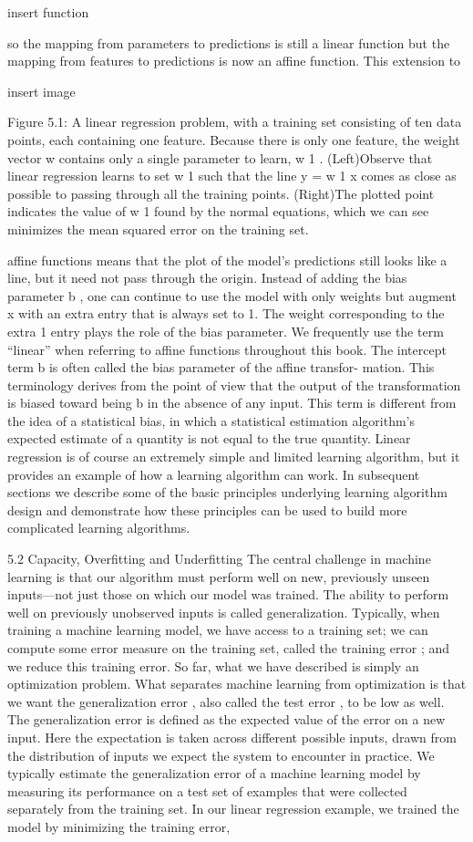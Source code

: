 \documentclass[11pt]{article}
\begin{document}
    insert function

so the mapping from parameters to predictions is still a linear function but the
mapping from features to predictions is now an aﬃne function. This extension to

    insert image

Figure 5.1: A linear regression problem, with a training set consisting of ten data points,
each containing one feature. Because there is only one feature, the weight vector
w
contains only a single parameter to learn,
w
1
. (Left)Observe that linear regression learns
to set
w
1
such that the line
y
=
w
1
x
comes as close as possible to passing through all the
training points. (Right)The plotted point indicates the value of
w
1
found by the normal
equations, which we can see minimizes the mean squared error on the training set.

aﬃne functions means that the plot of the model’s predictions still looks like a
line, but it need not pass through the origin. Instead of adding the bias parameter
b
, one can continue to use the model with only weights but augment
x
with an
extra entry that is always set to 1. The weight corresponding to the extra 1 entry
plays the role of the bias parameter. We frequently use the term “linear” when
referring to aﬃne functions throughout this book.
The intercept term
b
is often called the
bias
parameter of the aﬃne transfor-
mation. This terminology derives from the point of view that the output of the
transformation is biased toward being
b
in the absence of any input. This term
is diﬀerent from the idea of a statistical bias, in which a statistical estimation
algorithm’s expected estimate of a quantity is not equal to the true quantity.
Linear regression is of course an extremely simple and limited learning algorithm,
but it provides an example of how a learning algorithm can work. In subsequent
sections we describe some of the basic principles underlying learning algorithm
design and demonstrate how these principles can be used to build more complicated
learning algorithms.

5.2 Capacity, Overﬁtting and Underﬁtting
The central challenge in machine learning is that our algorithm must perform
well on new, previously unseen inputs—not just those on which our model was
trained. The ability to perform well on previously unobserved inputs is called
generalization.
Typically, when training a machine learning model, we have access to a training
set; we can compute some error measure on the training set, called the
training
error
; and we reduce this training error. So far, what we have described is simply
an optimization problem. What separates machine learning from optimization is
that we want the
generalization error
, also called the
test error
, to be low as
well. The generalization error is deﬁned as the expected value of the error on a
new input. Here the expectation is taken across diﬀerent possible inputs, drawn
from the distribution of inputs we expect the system to encounter in practice.
We typically estimate the generalization error of a machine learning model by
measuring its performance on a
test set
of examples that were collected separately
from the training set.
In our linear regression example, we trained the model by minimizing the
training error,
\end{document}
